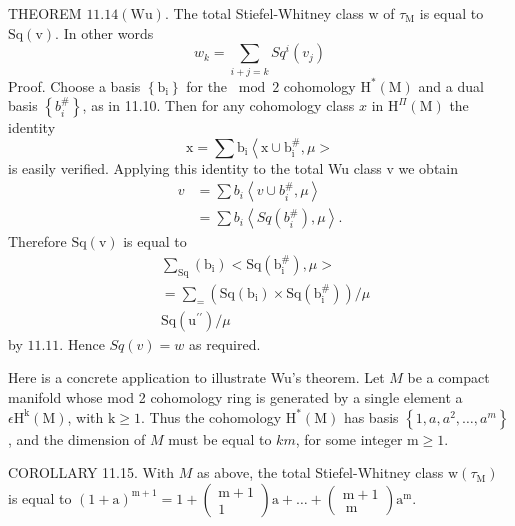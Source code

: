 \documentclass[10pt]{article}
\begin{document}
THEOREM $11.14(\mathrm{Wu})$. The total Stiefel-Whitney class $\mathrm{w}$ of $\tau_{\mathrm{M}}$ is equal to $\mathrm{Sq}(\mathrm{v})$. In other words
$$
w_{k}=\sum_{i+j=k} S q^{i}\left(v_{j}\right)
$$
Proof. Choose a basis $\left\{\mathrm{b}_{\mathrm{i}}\right\}$ for the $\bmod 2$ cohomology $\mathrm{H}^{*}(\mathrm{M})$ and a dual basis $\left\{b_{i}^{\#}\right\}$, as in 11.10. Then for any cohomology class $x$ in $\mathrm{H}^{\Pi}(\mathrm{M})$ the identity
$$
\mathrm{x}=\sum \mathrm{b}_{\mathrm{i}}\left\langle\mathrm{x} \cup \mathrm{b}_{\mathrm{i}}^{\#}, \mu>\right.
$$
is easily verified. Applying this identity to the total Wu class $\mathrm{v}$ we obtain
$$
\begin{aligned}
v &=\sum b_{i}\left\langle v \cup b_{i}^{\#}, \mu\right\rangle \\
&=\sum b_{i}\left\langle S q\left(b_{i}^{\#}\right), \mu\right\rangle .
\end{aligned}
$$
Therefore $\mathrm{Sq}(\mathrm{v})$ is equal to
$$
\begin{aligned}
&\sum_{\mathrm{Sq}}\left(\mathrm{b}_{\mathrm{i}}\right)<\mathrm{Sq}\left(\mathrm{b}_{\mathrm{i}}^{\#}\right), \mu> \\
&=\sum_{=}\left(\mathrm{Sq}\left(\mathrm{b}_{\mathrm{i}}\right) \times \mathrm{Sq}\left(\mathrm{b}_{\mathrm{i}}^{\#}\right)\right) / \mu \\
&\mathrm{Sq}\left(\mathrm{u}^{\prime \prime}\right) / \mu
\end{aligned}
$$
by $11.11$. Hence $S q(v)=w$ as required.

Here is a concrete application to illustrate Wu's theorem. Let $M$ be a compact manifold whose mod 2 cohomology ring is generated by a single element a $\epsilon \mathrm{H}^{\mathrm{k}}(\mathrm{M})$, with $\mathrm{k} \geq 1$. Thus the cohomology $\mathrm{H}^{*}(\mathrm{M})$ has basis $\left\{1, a, a^{2}, \ldots, a^{m}\right\}$, and the dimension of $M$ must be equal to $k m$, for some integer $\mathrm{m} \geq 1$.

COROLLARY 11.15. With $M$ as above, the total Stiefel-Whitney class $\mathrm{w}\left(\tau_{\mathrm{M}}\right)$ is equal to $(1+\mathrm{a})^{\mathrm{m}+1}=1+\left(\begin{array}{c}\mathrm{m}+1 \\ 1\end{array}\right) \mathrm{a}+\ldots+\left(\begin{array}{c}\mathrm{m}+1 \\ \mathrm{~m}\end{array}\right) \mathrm{a}^{\mathrm{m}}$.
\end{document}
